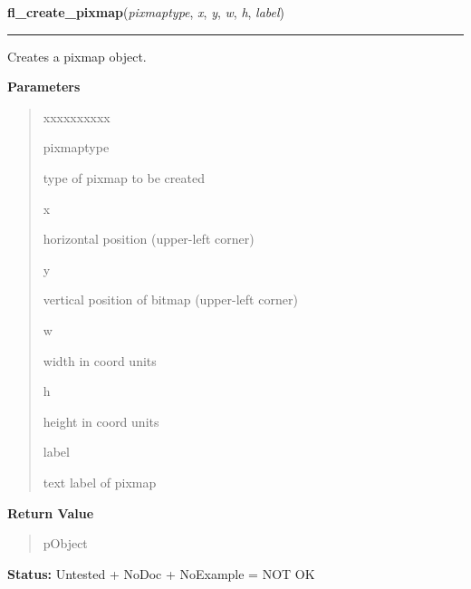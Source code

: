 \hspace{.8\funcindent}\begin{boxedminipage}{\funcwidth}

    \raggedright \textbf{fl\_create\_pixmap}(\textit{pixmaptype}, \textit{x}, \textit{y}, \textit{w}, \textit{h}, \textit{label})

    \vspace{-1.5ex}

    \rule{\textwidth}{0.5\fboxrule}
\setlength{\parskip}{2ex}
    Creates a pixmap object.

\setlength{\parskip}{1ex}
      \textbf{Parameters}
      \vspace{-1ex}

      \begin{quote}
        \begin{Ventry}{xxxxxxxxxx}

          \item[pixmaptype]

          type of pixmap to be created

          \item[x]

          horizontal position (upper-left corner)

          \item[y]

          vertical position of bitmap (upper-left corner)

          \item[w]

          width in coord units

          \item[h]

          height in coord units

          \item[label]

          text label of pixmap

        \end{Ventry}

      \end{quote}

      \textbf{Return Value}
    \vspace{-1ex}

      \begin{quote}
      pObject

      \end{quote}

\textbf{Status:} Untested + NoDoc + NoExample = NOT OK



    \end{boxedminipage}


